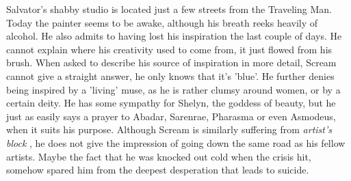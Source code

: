Salvator's shabby studio is located just a few streets from the Traveling Man. Today the painter seems to be awake, although his breath reeks heavily of alcohol. He also admits to having lost his inspiration the last couple of days. He cannot explain where his creativity used to come from, it just flowed from his brush. When asked to describe his source of inspiration in more detail, Scream cannot give a straight answer, he only knows that it's 'blue'. He further denies being inspired by a 'living' muse, as he is rather clumsy around women, or by a certain deity. He has some sympathy for Shelyn, the goddess of beauty, but he just as easily says a prayer to Abadar, Sarenrae, Pharasma or even Asmodeus, when it suits his purpose. Although Scream is similarly suffering from {\itshape artist's block} , he does not give the impression of going down the same road as his fellow artists. Maybe the fact that he was knocked out cold when the crisis hit, somehow spared him from the deepest desperation that leads to suicide. 